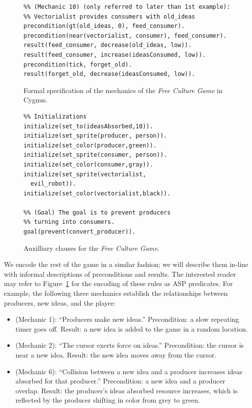 \documentclass[a4paper]{article}
\begin{document}
\begin{figure}
\begin{verbatim}
%% (Mechanic 10) (only referred to later than 1st example):
%% Vectorialist provides consumers with old_ideas
precondition(gt(old_ideas, 0), feed_consumer).
precondition(near(vectorialist, consumer), feed_consumer).
result(feed_consumer, decrease(old_ideas, low)).
result(feed_consumer, increase(ideasConsumed, low)).
precondition(tick, forget_old).
result(forget_old, decrease(ideasConsumed, low)).
\end{verbatim}

\caption{Formal specification of the mechanics of the \textit{Free Culture Game} in Cygnus.}
\label{fig:fcgformal}
\end{figure}

\begin{figure}
\begin{verbatim}
%% Initializations
initialize(set_to(ideasAbsorbed,10)).
initialize(set_sprite(producer, person)).
initialize(set_color(producer,green)).
initialize(set_sprite(consumer, person)).
initialize(set_color(consumer,gray)).
initialize(set_sprite(vectorialist, 
  evil_robot)).
initialize(set_color(vectorialist,black)).

%% (Goal) The goal is to prevent producers 
%% turning into consumers.
goal(prevent(convert_producer)).
\end{verbatim}
\caption{Auxilliary clauses for the \textit{Free Culture Game}.}
\label{fig:fcgaux}
\end{figure}

We encode the rest of the game in a similar fashion; we will describe them
in-line with informal descriptions of preconditions and results. The
interested reader may refer to Figure~\ref{fig:fcgformal} for the encoding of
these rules as ASP predicates.
For example, the following three mechanics establish the relationships
between producers, new ideas, and the player:

\begin{itemize}

\item (Mechanic 1): ``Producers make new ideas.'' Precondition: a slow
repeating timer goes off. Result: a new idea is added to the game in a
random location.

\item (Mechanic 2): ``The cursor exerts force on ideas.'' Precondition: the
cursor is near a new idea. Result: the new idea moves away from the cursor.

\item (Mechanic 6): ``Collision between a new idea and a producer increases
ideas absorbed for that producer.'' Precondition: a new idea and a producer
overlap. Result: the producer's ideas absorbed resource increases, which is
reflected by the producer shifting in color from grey to green.

\end{itemize}
\end{document}
